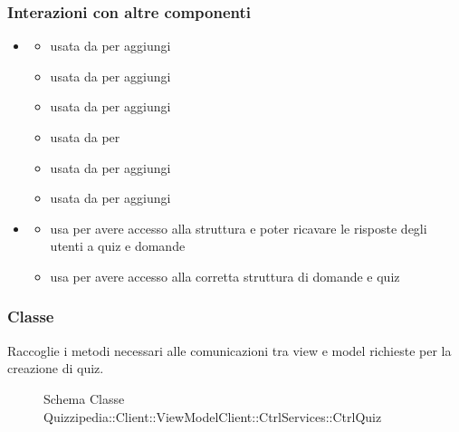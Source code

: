 \subsubsection{Interazioni con altre componenti}
\begin{itemize}
\item {}
\begin{itemize}
\item usata da  per aggiungi
\item usata da  per aggiungi
\item usata da  per aggiungi
\item usata da  per 
\item usata da  per aggiungi
\item usata da  per aggiungi
\end{itemize}
\item {}
\begin{itemize}
\item usa  per avere accesso alla struttura e poter ricavare le risposte degli utenti a quiz e domande
\item usa  per avere accesso alla corretta struttura di domande e quiz
\end{itemize}
\end{itemize}
\subsubsection{Classe }
Raccoglie i metodi necessari alle comunicazioni tra view e model richieste per la creazione di quiz.
\begin{figure}[H]
\centering
\noindent{}
\caption[Schema Classe CtrlQuiz]{Schema Classe Quizzipedia::Client::ViewModelClient::CtrlServices::CtrlQuiz}
\end{figure}
